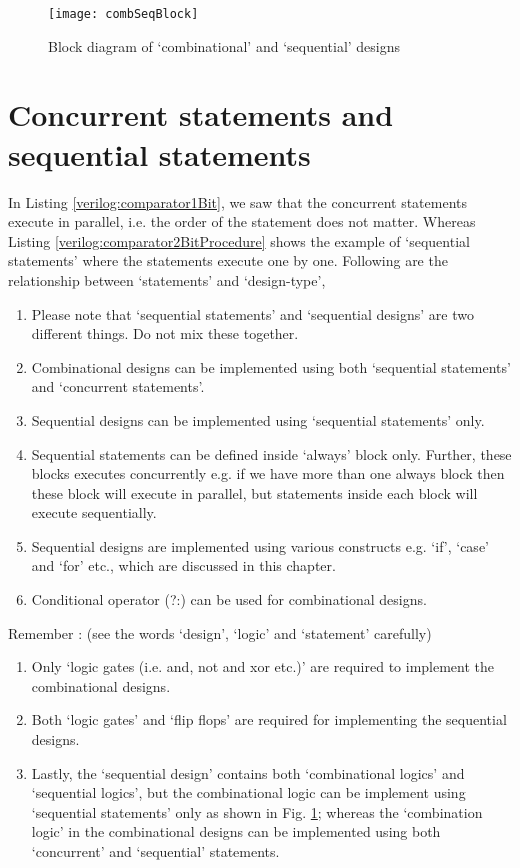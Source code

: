 \begin{figure}[!h]
	\centering
	\texttt{[image: combSeqBlock]}
	\caption{Block diagram of `combinational' and `sequential' designs}
	\label{fig:combSeqBlock}
\end{figure}


\section{Concurrent statements and sequential statements}\label{sec:concurrentSeq}

In Listing \ref{verilog:comparator1Bit}, we saw that the concurrent statements execute in parallel, i.e. the order of the statement does not matter. Whereas Listing \ref{verilog:comparator2BitProcedure} shows the example of `sequential statements' where the statements execute one by one. Following are the relationship between `statements' and `design-type',

\begin{enumerate}
	\item Please note that `sequential statements' and `sequential designs' are two different things. Do not mix these together.
	\item Combinational designs can be implemented using both `sequential statements' and `concurrent statements'. 
	\item Sequential designs can be implemented using `sequential statements' only. 
	\item Sequential statements can be defined inside `always' block only. Further, these blocks executes concurrently e.g. if we have more than one always block then these block will execute in parallel, but statements inside each block will execute sequentially. 
	\item Sequential designs are implemented using various constructs e.g. `if', `case' and `for' etc., which are discussed in this chapter.
	\item Conditional operator (?:) can be used for combinational designs. 
\end{enumerate}

\begin{noNumBox}
	Remember : (see the words `design', `logic' and `statement' carefully) 
	\begin{enumerate}
		\item Only `logic gates (i.e. and, not and xor etc.)' are required to implement the combinational designs.
		\item Both `logic gates' and `flip flops' are required for implementing the sequential designs. 
		\item Lastly, the `sequential design' contains both `combinational logics' and `sequential logics', but the combinational logic can be implement using `sequential statements' only as shown in Fig. \ref{fig:combSeqBlock}; whereas the `combination logic' in the combinational designs can be implemented using both `concurrent' and `sequential' statements.
	\end{enumerate}
\end{noNumBox}

